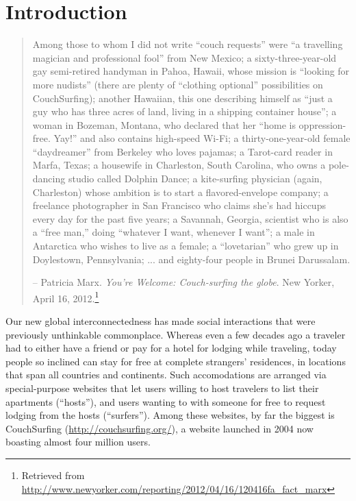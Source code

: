 \section{Introduction} \label{sec:introduction}

\begin{quotation}
Among those to whom I did not write “couch requests” were “a travelling magician and professional fool” from New Mexico; a sixty-three-year-old gay semi-retired handyman in Pahoa, Hawaii, whose mission is “looking for more nudists” (there are plenty of “clothing optional” possibilities on CouchSurfing); another Hawaiian, this one describing himself as “just a guy who has three acres of land, living in a shipping container house”; a woman in Bozeman, Montana, who declared that her “home is oppression-free. Yay!” and also contains high-speed Wi-Fi; a thirty-one-year-old female “daydreamer” from Berkeley who loves pajamas; a Tarot-card reader in Marfa, Texas; a housewife in Charleston, South Carolina, who owns a pole-dancing studio called Dolphin Dance; a kite-surfing physician (again, Charleston) whose ambition is to start a flavored-envelope company; a freelance photographer in San Francisco who claims she’s had hiccups every day for the past five years; a Savannah, Georgia, scientist who is also a “free man,” doing “whatever I want, whenever I want”; a male in Antarctica who wishes to live as a female; a “lovetarian” who grew up in Doylestown, Pennsylvania; ... and eighty-four people in Brunei Darussalam.

-- Patricia Marx. \emph{You're Welcome: Couch-surfing the globe}. New Yorker, April 16, 2012.\footnote{Retrieved from \url{http://www.newyorker.com/reporting/2012/04/16/120416fa_fact_marx}}
\end{quotation}

Our new global interconnectedness has made social interactions that were previously unthinkable commonplace.
Whereas even a few decades ago a traveler had to either have a friend or pay for a hotel for lodging while traveling, today people so inclined can stay for free at complete strangers' residences, in locations that span all countries and continents.
Such accomodations are arranged via special-purpose websites that let users willing to host travelers to list their apartments (``hosts''), and users wanting to with someone for free to request lodging from the hosts (``surfers'').
Among these websites, by far the biggest is CouchSurfing (\url{http://couchsurfing.org/}), a website launched in 2004 now boasting almost four million users.

